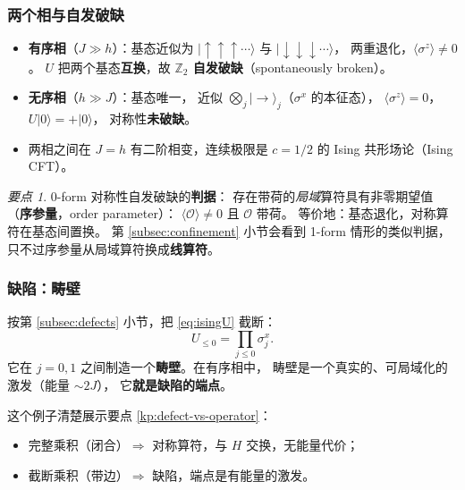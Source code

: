 \documentclass[UTF8,a4paper,11pt]{ctexart}
\theoremstyle{plain}
\theoremstyle{definition}
\theoremstyle{remark}
\newtheorem{keypoint}{要点}[section]
\newcommand{\ZZ}{\mathbb{Z}}
\newcommand{\Op}{\mathcal{O}}
\newcommand{\en}[1]{\textsf{#1}}       %
\newcommand{\Uop}{U}
\begin{document}
\subsubsection{两个相与自发破缺}

\begin{itemize}
  \item \textbf{有序相}（$J\gg h$）：基态近似为
        $|\!\uparrow\uparrow\uparrow\cdots\rangle$ 与
        $|\!\downarrow\downarrow\downarrow\cdots\rangle$，
        两重退化，$\langle\sigma^z\rangle\ne0$。
        $\Uop$ 把两个基态\textbf{互换}，故
        \textbf{$\ZZ_2$ 自发破缺}（\en{spontaneously broken}）。
  \item \textbf{无序相}（$h\gg J$）：基态唯一，
        近似 $\bigotimes_j|\rightarrow\rangle_j$（$\sigma^x$ 的本征态），
        $\langle\sigma^z\rangle=0$，$\Uop|0\rangle=+|0\rangle$，
        对称性\textbf{未破缺}。
  \item 两相之间在 $J=h$ 有二阶相变，连续极限是
        $c=1/2$ 的 Ising 共形场论（\en{Ising CFT}）。
\end{itemize}

\begin{keypoint}
\label{kp:ssb-0form}
0-form 对称性自发破缺的\textbf{判据}：
存在带荷的\emph{局域}算符具有非零期望值
（\textbf{序参量}，\en{order parameter}）：
$\langle\Op\rangle\ne0$ 且 $\Op$ 带荷。
等价地：基态退化，对称算符在基态间置换。
第 \ref{subsec:confinement} 小节会看到 1-form 情形的类似判据，
只不过序参量从局域算符换成\textbf{线算符}。
\end{keypoint}

\subsubsection{缺陷：畴壁}

按第 \ref{subsec:defects} 小节，把 \eqref{eq:isingU} 截断：
\begin{equation}
  \Uop_{\le0}=\prod_{j\le 0}\sigma^x_j .
\end{equation}
它在 $j=0,1$ 之间制造一个\textbf{畴壁}。在有序相中，
畴壁是一个真实的、可局域化的激发（能量 $\sim 2J$），
它\textbf{就是缺陷的端点}。

这个例子清楚展示要点 \ref{kp:defect-vs-operator}：
\begin{itemize}
  \item 完整乘积（闭合）$\Rightarrow$ 对称算符，与 $H$ 交换，无能量代价；
  \item 截断乘积（带边）$\Rightarrow$ 缺陷，端点是有能量的激发。
\end{itemize}
\end{document}
